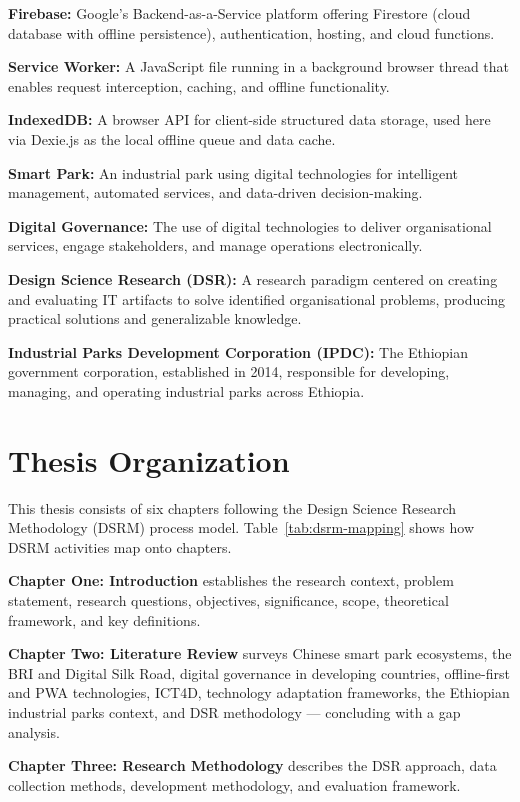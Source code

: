 \textbf{Firebase:} Google's Backend-as-a-Service platform offering Firestore (cloud database with offline persistence), authentication, hosting, and cloud functions.

\textbf{Service Worker:} A JavaScript file running in a background browser thread that enables request interception, caching, and offline functionality.

\textbf{IndexedDB:} A browser API for client-side structured data storage, used here via Dexie.js as the local offline queue and data cache.

\textbf{Smart Park:} An industrial park using digital technologies for intelligent management, automated services, and data-driven decision-making.

\textbf{Digital Governance:} The use of digital technologies to deliver organisational services, engage stakeholders, and manage operations electronically.

\textbf{Design Science Research (DSR):} A research paradigm centered on creating and evaluating IT artifacts to solve identified organisational problems, producing practical solutions and generalizable knowledge.

\textbf{Industrial Parks Development Corporation (IPDC):} The Ethiopian government corporation, established in 2014, responsible for developing, managing, and operating industrial parks across Ethiopia.

\section{Thesis Organization}

This thesis consists of six chapters following the Design Science Research Methodology (DSRM) process model. Table~\ref{tab:dsrm-mapping} shows how DSRM activities map onto chapters.

\textbf{Chapter One: Introduction} establishes the research context, problem statement, research questions, objectives, significance, scope, theoretical framework, and key definitions.

\textbf{Chapter Two: Literature Review} surveys Chinese smart park ecosystems, the BRI and Digital Silk Road, digital governance in developing countries, offline-first and PWA technologies, ICT4D, technology adaptation frameworks, the Ethiopian industrial parks context, and DSR methodology — concluding with a gap analysis.

\textbf{Chapter Three: Research Methodology} describes the DSR approach, data collection methods, development methodology, and evaluation framework.

